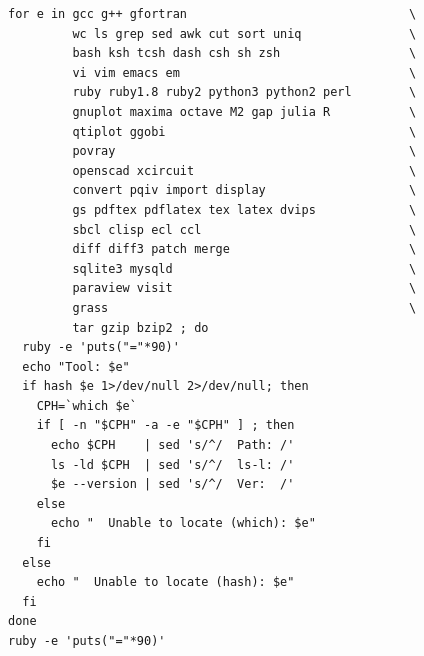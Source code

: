 \documentclass[11pt]{article}
\begin{document}
\begin{verbatim}
for e in gcc g++ gfortran                               \
         wc ls grep sed awk cut sort uniq               \
         bash ksh tcsh dash csh sh zsh                  \
         vi vim emacs em                                \
         ruby ruby1.8 ruby2 python3 python2 perl        \
         gnuplot maxima octave M2 gap julia R           \
         qtiplot ggobi                                  \
         povray                                         \
         openscad xcircuit                              \
         convert pqiv import display                    \
         gs pdftex pdflatex tex latex dvips             \
         sbcl clisp ecl ccl                             \
         diff diff3 patch merge                         \
         sqlite3 mysqld                                 \
         paraview visit                                 \
         grass                                          \
         tar gzip bzip2 ; do
  ruby -e 'puts("="*90)'
  echo "Tool: $e"
  if hash $e 1>/dev/null 2>/dev/null; then 
    CPH=`which $e`
    if [ -n "$CPH" -a -e "$CPH" ] ; then
      echo $CPH    | sed 's/^/  Path: /'
      ls -ld $CPH  | sed 's/^/  ls-l: /'
      $e --version | sed 's/^/  Ver:  /'
    else
      echo "  Unable to locate (which): $e"
    fi
  else
    echo "  Unable to locate (hash): $e"
  fi
done
ruby -e 'puts("="*90)'
\end{verbatim}
\end{document}
